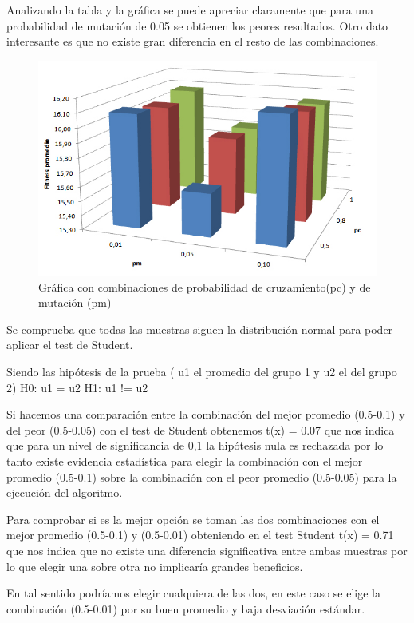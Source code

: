 Analizando la tabla y la gráfica se puede apreciar claramente que para una probabilidad de mutación de 0.05 se obtienen los peores resultados. Otro dato interesante es que no existe gran diferencia en el resto de las combinaciones.

\begin{figure}[H]
	\centering
	\includegraphics[width=0.8\linewidth]{Figures/grafica_mutacion_cruzamiento}
	\caption{Gráfica con combinaciones de probabilidad de cruzamiento(pc) y de mutación (pm)}
	\label{fig:grafica_mutacion_cruzamiento}
\end{figure}


Se comprueba que todas las muestras siguen la distribución normal  para poder aplicar el test de Student.

Siendo las hipótesis de la prueba ( u1 el promedio del  grupo 1 y u2 el del grupo 2) \newline
H0: u1  = u2  \newline
H1: u1 != u2 \newline

Si hacemos una comparación entre la combinación del mejor promedio (0.5-0.1) y del peor (0.5-0.05) con el test de Student obtenemos t(x) = 0.07 que nos indica que para un nivel de significancia de  0,1 la hipótesis nula es rechazada por lo tanto existe evidencia estadística para elegir la combinación con el mejor promedio (0.5-0.1) sobre la combinación con el peor promedio (0.5-0.05) para la ejecución del algoritmo.

Para comprobar si es la mejor opción  se toman las dos combinaciones con el mejor promedio (0.5-0.1) y (0.5-0.01) obteniendo en el test Student t(x) = 0.71 que nos indica que no existe una diferencia significativa entre ambas muestras por lo que elegir una sobre otra no implicaría grandes beneficios.

En tal sentido podríamos elegir cualquiera de las dos, en este caso se elige  la combinación (0.5-0.01) por su buen promedio y baja desviación estándar.



